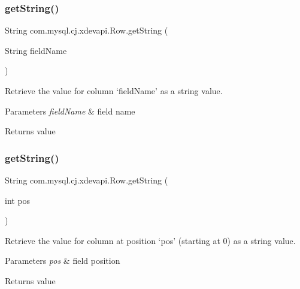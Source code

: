 \subsubsection{\texorpdfstring{get\+String()}{getString()}\hspace{0.1cm}{\footnotesize\ttfamily [1/2]}}
{\footnotesize\ttfamily String com.\+mysql.\+cj.\+xdevapi.\+Row.\+get\+String (\begin{DoxyParamCaption}\item[{String}]{field\+Name }\end{DoxyParamCaption})}

Retrieve the value for column `field\+Name' as a string value.


\begin{DoxyParams}{Parameters}
{\em field\+Name} & field name \\
\hline
\end{DoxyParams}
\begin{DoxyReturn}{Returns}
value 
\end{DoxyReturn}
\mbox{\label{interfacecom_1_1mysql_1_1cj_1_1xdevapi_1_1_row_a9541aea8429441708b11c5e46f07daec}} 
\subsubsection{\texorpdfstring{get\+String()}{getString()}\hspace{0.1cm}{\footnotesize\ttfamily [2/2]}}
{\footnotesize\ttfamily String com.\+mysql.\+cj.\+xdevapi.\+Row.\+get\+String (\begin{DoxyParamCaption}\item[{int}]{pos }\end{DoxyParamCaption})}

Retrieve the value for column at position `pos' (starting at 0) as a string value.


\begin{DoxyParams}{Parameters}
{\em pos} & field position \\
\hline
\end{DoxyParams}
\begin{DoxyReturn}{Returns}
value 
\end{DoxyReturn}
\mbox{\label{interfacecom_1_1mysql_1_1cj_1_1xdevapi_1_1_row_aafc98ec7296e3b5746e4cd3c994312e3}} 

